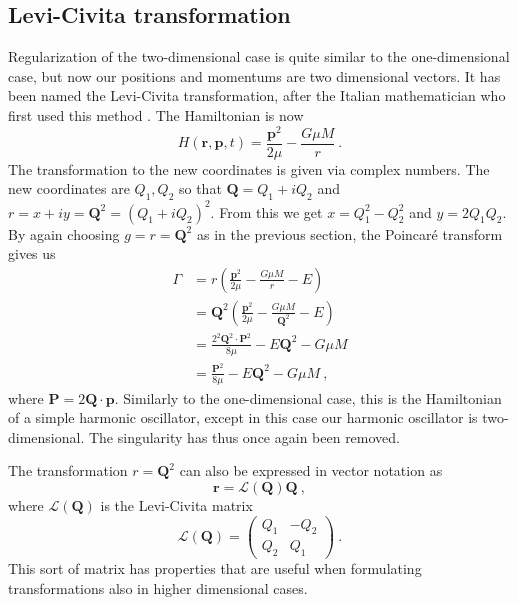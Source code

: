 \documentclass[english, oneside]{HYgradu}
\begin{document}
\subsection{Levi-Civita transformation}

Regularization of the two-dimensional case is quite similar to the one-dimensional case, but now our positions and momentums are two dimensional vectors. It has been named the Levi-Civita transformation, after the Italian mathematician who first used this method \citep{levi-civita:1920}. The Hamiltonian is now
\begin{equation}
H(\mathbf{r},\mathbf{p},t) = \frac{\mathbf{p}^2}{2 \mu} - \frac{G \mu M}{r} \ .
\end{equation}
The transformation to the new coordinates is given via complex numbers. The new coordinates are $Q_1, Q_2$ so that $\mathbf{Q} = Q_1 + iQ_2$ and $r = x + iy = \mathbf{Q}^2 = (Q_1 + iQ_2)^2$. From this we get $x = Q_1^2 - Q_2^2$ and $y = 2Q_1 Q_2$. By again choosing $g = r = \mathbf{Q}^2$ as in the previous section, the Poincaré transform gives us 
\begin{align}
\Gamma &= r \left( \frac{\mathbf{p}^2}{2 \mu} - \frac{G \mu M}{r} - E \right) \nonumber \\ 
&= \mathbf{Q}^2 \left( \frac{\mathbf{p}^2}{2 \mu} - \frac{G \mu M}{\mathbf{Q}^2} - E \right) \nonumber \\
&= \frac{2^2 \mathbf{Q}^2 \cdot \mathbf{P}^2}{8 \mu} - E \mathbf{Q}^2 - G \mu M \nonumber \\
&= \frac{\mathbf{P}^2}{8 \mu} - E \mathbf{Q}^2 - G \mu M \ ,
\end{align}
where $\mathbf{P} = 2 \mathbf{Q} \cdot \mathbf{p}$. Similarly to the one-dimensional case, this is the Hamiltonian of a simple harmonic oscillator, except in this case our harmonic oscillator is two-dimensional. The singularity has thus once again been removed.

The transformation $r = \mathbf{Q}^2$ can also be expressed in vector notation as
\begin{equation}
\mathbf{r} = \mathcal{L}(\mathbf{Q}) \mathbf{Q} \ ,
\end{equation}
where $\mathcal{L}(\mathbf{Q})$ is the Levi-Civita matrix
\begin{equation}
\mathcal{L}(\mathbf{Q}) =
\begin{pmatrix}
Q_1 & -Q_2 \\
Q_2 & Q_1
\end{pmatrix} \ .
\end{equation}
This sort of matrix has properties that are useful when formulating transformations also in higher dimensional cases.
\end{document}
